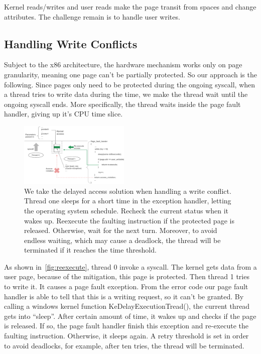 Kernel reads/writes and user reads make the page transit from spaces and change attributes. The challenge remain is to handle user writes. 


\subsection{Handling Write Conflicts}
Subject to the x86 architecture, the hardware mechanism works only on page granularity, meaning one page can't be partially protected. So our approach is the following. Since pages only need to be protected during the ongoing syscall, when a thread tries to write data during the time, we make the thread wait until the ongoing syscall ends. More specifically, the thread waits inside the page fault handler, giving up it's CPU time slice. 

\begin{figure}[th]
  \includegraphics[width=0.47\textwidth]{figures/reexecute}
  \centering
  \caption{We take the delayed access solution when handling a write conflict. Thread one sleeps for a short time in the exception handler, letting the operating system schedule. Recheck the current status when it wakes up. Reexecute the faulting instruction if the protected page is released. Otherwise, wait for the next turn. Moreover, to avoid endless waiting, which may cause a deadlock, the thread will be terminated if it reaches the time threshold.}
  \label{fig:reexecute}
\end{figure}


As shown in~\autoref{fig:reexecute}, thread 0 invoke a syscall. The kernel gets data from a user page, because of the mitigation, this page is protected. Then thread 1 tries to write it. It causes a page fault exception. From the error code our page fault handler is able to tell that this is a writing request, so it can't be granted. By calling a windows kernel function KeDelayExecutionTread(), the current thread gets into ``sleep''. After certain amount of time, it wakes up and checks if the page is released. If so, the page fault handler finish this exception and re-execute the faulting instruction. Otherwise, it sleeps again. A retry threshold is set in order to avoid deadlocks, for example, after ten tries, the thread will be terminated.  


